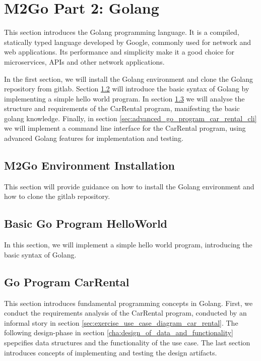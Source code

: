 \chapter{M2Go Part 2: Golang}
\label{cha:golang}
This section introduces the Golang programming language.
It is a compiled, statically typed language developed by Google, commonly used for network and web applications.
Its performance and simplicity make it a good choice for microservices, APIs and other network applications.

In the first section, we will install the Golang environment and clone the Golang repository from gitlab.
Section \ref{sec:basic_go_program} will introduce the basic syntax of Golang by implementing a simple hello world program.
In section \ref{sec:go_program_car_rental} we will analyse the structure and requirements of the CarRental program, manifesting the basic golang knowledge.
Finally, in section \ref{sec:advanced_go_program_car_rental_cli} we will implement a command line interface for the CarRental program, using advanced Golang features for implementation and testing.


\section{M2Go Environment Installation}
\label{sec:m2go_env_installation}
This section will provide guidance on how to install the Golang environment and how to clone the gitlab repository.





\section{Basic Go Program HelloWorld}
\label{sec:basic_go_program}
In this section, we will implement a simple hello world program, introducing the basic syntax of Golang.




\section{Go Program CarRental}
\label{sec:go_program_car_rental}
This section introduces fundamental programming concepts in Golang.
First, we conduct the requirements analysis of the CarRental program, conducted by an informal story in section \ref{sec:exercise_use_case_diagram_car_rental}.
The following design-phase in section \ref{cha:design_of_data_and_functionality} spepcifies data structures and the functionality of the use case.
The last section introduces concepts of implementing and testing the design artifacts.

